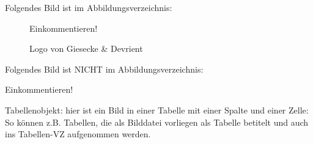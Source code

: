 \documentclass[12pt,oneside,a4paper,bibtotoc,liststotoc,pointlessnumbers]{scrartcl}
\begin{document}
\begin{appendix}
\nocite{*}

\newpage
Folgendes Bild ist im Abbildungsverzeichnis:
\begin{figure}[h]							
\centering 
Einkommentieren!
\caption{Logo von Giesecke \& Devrient}									%
\label{fig:LogoGD}												%
\end{figure}

Folgendes Bild ist NICHT im Abbildungsverzeichnis: \\ %
\begin{center}
Einkommentieren!
\end{center}

Tabellenobjekt: hier ist ein Bild in einer Tabelle mit einer Spalte und einer Zelle:
So können z.B. Tabellen, die als Bilddatei vorliegen als Tabelle betitelt und auch ins Tabellen-VZ aufgenommen werden.
%




\end{appendix}

\end{document}
